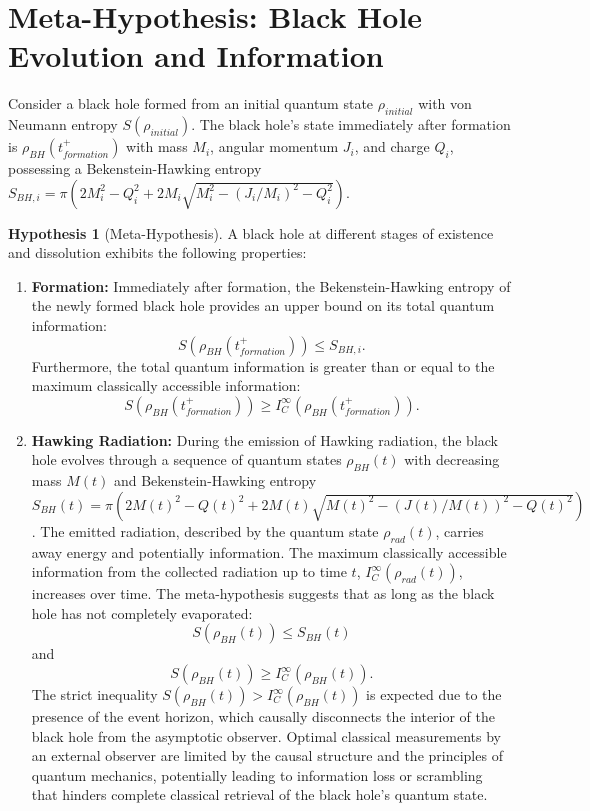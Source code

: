 \documentclass{article}
\theoremstyle{definition}
\newtheorem{hypothesis}[definition]{Hypothesis}
\begin{document}
	\section{Meta-Hypothesis: Black Hole Evolution and Information}
	
	Consider a black hole formed from an initial quantum state $\rho_{initial}$ with von Neumann entropy $S(\rho_{initial})$. The black hole's state immediately after formation is $\rho_{BH}(t_{formation}^+)$ with mass $M_i$, angular momentum $J_i$, and charge $Q_i$, possessing a Bekenstein-Hawking entropy $S_{BH, i} = \pi \left( 2 M_i^2 - Q_i^2 + 2 M_i \sqrt{M_i^2 - (J_i/M_i)^2 - Q_i^2} \right)$.
	
	\begin{hypothesis}[Meta-Hypothesis]
		A black hole at different stages of existence and dissolution exhibits the following properties:
		\begin{enumerate}
			\item \textbf{Formation:} Immediately after formation, the Bekenstein-Hawking entropy of the newly formed black hole provides an upper bound on its total quantum information:
			$$S(\rho_{BH}(t_{formation}^+)) \le S_{BH, i}.$$
			Furthermore, the total quantum information is greater than or equal to the maximum classically accessible information:
			$$S(\rho_{BH}(t_{formation}^+)) \ge I_C^{\infty}(\rho_{BH}(t_{formation}^+)).$$
			
			\item \textbf{Hawking Radiation:} During the emission of Hawking radiation, the black hole evolves through a sequence of quantum states $\rho_{BH}(t)$ with decreasing mass $M(t)$ and Bekenstein-Hawking entropy $S_{BH}(t) = \pi \left( 2 M(t)^2 - Q(t)^2 + 2 M(t) \sqrt{M(t)^2 - (J(t)/M(t))^2 - Q(t)^2} \right)$. The emitted radiation, described by the quantum state $\rho_{rad}(t)$, carries away energy and potentially information. The maximum classically accessible information from the collected radiation up to time $t$, $I_C^{\infty}(\rho_{rad}(t))$, increases over time. The meta-hypothesis suggests that as long as the black hole has not completely evaporated:
			$$S(\rho_{BH}(t)) \le S_{BH}(t)$$
			and
			$$S(\rho_{BH}(t)) \ge I_C^{\infty}(\rho_{BH}(t)).$$
			The strict inequality $S(\rho_{BH}(t)) > I_C^{\infty}(\rho_{BH}(t))$ is expected due to the presence of the event horizon, which causally disconnects the interior of the black hole from the asymptotic observer. Optimal classical measurements by an external observer are limited by the causal structure and the principles of quantum mechanics, potentially leading to information loss or scrambling that hinders complete classical retrieval of the black hole's quantum state.
			

\end{enumerate}
\end{hypothesis}
\end{document}
